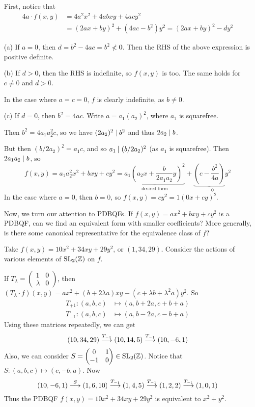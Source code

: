 \documentclass{article}
\begin{document}
\begin{prf}
	First, notice that
    \begin{align*}
    4a \cdot f(x, y) &= 4a^2x^2 + 4abxy + 4acy^2 \\
    &= (2ax + by)^2 + (4ac - b^2)y^2 = (2ax + by)^2 - dy^2
	\end{align*}
	
	(a) If $a = 0$, then $d = b^2 - 4ac = b^2 \not < 0$. Then the RHS of the above expression is positive definite. 
	
	(b) If $d > 0$, then the RHS is indefinite, so $f(x, y)$ is too. The same holds for $c \neq 0$ and $d > 0$.
	
	In the case where $a = c = 0$, $f$ is clearly indefinite, as $b \neq 0$.
	
	(c) If $d = 0$, then $b^2 = 4ac$. Write $a = a_1 (a_2)^2$, where $a_1$ is squarefree.
	
	Then $b^2 = 4a_1 a_2^2 c$, so we have $(2a_2)^2 \mid b^2$ and thus $2a_2 \mid b$.
	
	But then $(b/2a_2)^2 = a_1 c$, and so $a_1 \mid (b/2a_2)^2$ (as $a_1$ is squarefree). Then $2a_1a_2 \mid b$, so
	\[
		f(x, y) = a_1 a_2^2 x^2 + bxy + cy^2 = \underbrace{a_1 \left( a_2 x + \frac{b}{2a_1 a_2} y \right)^2}_{\text{desired form}} + \underbrace{\left( c - \frac{b^2}{4a} \right)}_{= 0} y^2
	\]
	In the case where $a = 0$, then $b = 0$, so $f(x, y) = cy^2 = 1(0x + cy)^2$.
\end{prf}

Now, we turn our attention to PDBQFs. If $f(x, y) = ax^2 + bxy + cy^2$ is a PDBQF, can we find an equivalent form with smaller coefficients? More generally, is there some canonical representative for the equivalence class of $f$?

\begin{example}
    Take $f(x, y) = 10x^2 + 34xy + 29y^2$, or $(1, 34, 29)$. Consider the actions of various elements of $\mathrm{SL}_2(\mathbb{Z})$ on $f$.
    
    If $T_\lambda = \begin{pmatrix} 1 & 0 \\ \lambda & 0 \end{pmatrix}$, then $(T_\lambda \cdot f)(x, y) = ax^2 + (b + 2\lambda a)xy + (c + \lambda b + \lambda^2 a) y^2$. So
	\begin{align*}
    T_{+1}: (a, b, c) &\mapsto (a, b+2a, c+b+a) \\
    T_{-1}: (a, b, c) &\mapsto (a, b-2a, c-b+a)
	\end{align*}
	Using these matrices repeatedly, we can get
	\[
	(10, 34, 29) \stackrel{T_{-1}}{\longrightarrow} (10, 14, 5) \stackrel{T_{-1}}{\longrightarrow} (10, -6, 1)
	\]
	Also, we can consider $S = \begin{pmatrix} 0 & 1 \\ -1 & 0 \end{pmatrix} \in \mathrm{SL}_2(\mathbb{Z})$. Notice that $S: (a, b, c) \mapsto (c, -b, a)$. Now
	\[
	(10, -6, 1) \stackrel{S}{\longrightarrow} (1, 6, 10) \stackrel{T_{-1}}{\longrightarrow} (1, 4, 5) \stackrel{T_{-1}}{\longrightarrow} (1, 2, 2) \stackrel{T_{-1}}{\longrightarrow} (1, 0, 1)
	\]
	Thus the PDBQF $f(x, y) = 10x^2 + 34xy + 29y^2$ is equivalent to $x^2 + y^2$.
\end{example}
\end{document}
